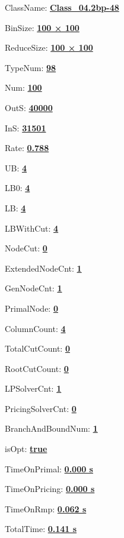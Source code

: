 \documentclass[11pt]{article}
\begin{document}
\pagestyle{empty}


ClassName: \underline{\textbf{Class_04.2bp-48}}
\par
BinSize: \underline{\textbf{100 × 100}}
\par
ReduceSize: \underline{\textbf{100 × 100}}
\par
TypeNum: \underline{\textbf{98}}
\par
Num: \underline{\textbf{100}}
\par
OutS: \underline{\textbf{40000}}
\par
InS: \underline{\textbf{31501}}
\par
Rate: \underline{\textbf{0.788}}
\par
UB: \underline{\textbf{4}}
\par
LB0: \underline{\textbf{4}}
\par
LB: \underline{\textbf{4}}
\par
LBWithCut: \underline{\textbf{4}}
\par
NodeCut: \underline{\textbf{0}}
\par
ExtendedNodeCnt: \underline{\textbf{1}}
\par
GenNodeCnt: \underline{\textbf{1}}
\par
PrimalNode: \underline{\textbf{0}}
\par
ColumnCount: \underline{\textbf{4}}
\par
TotalCutCount: \underline{\textbf{0}}
\par
RootCutCount: \underline{\textbf{0}}
\par
LPSolverCnt: \underline{\textbf{1}}
\par
PricingSolverCnt: \underline{\textbf{0}}
\par
BranchAndBoundNum: \underline{\textbf{1}}
\par
isOpt: \underline{\textbf{true}}
\par
TimeOnPrimal: \underline{\textbf{0.000 s}}
\par
TimeOnPricing: \underline{\textbf{0.000 s}}
\par
TimeOnRmp: \underline{\textbf{0.062 s}}
\par
TotalTime: \underline{\textbf{0.141 s}}
\par
\newpage
\end{document}
